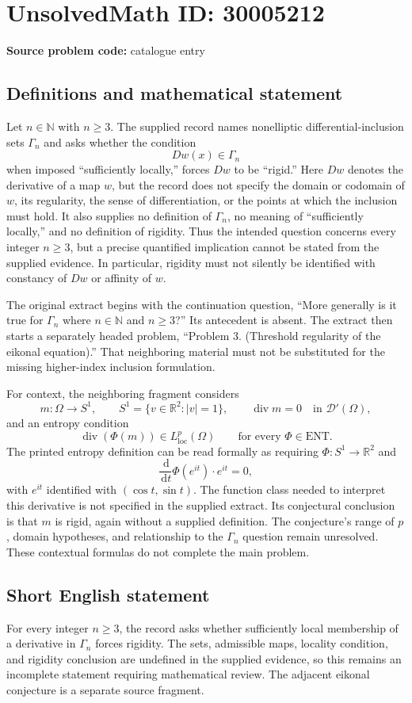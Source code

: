 \documentclass[11pt]{article}
\newcommand{\N}{\mathbb{N}}
\newcommand{\R}{\mathbb{R}}
\newcommand{\dd}{\,\mathrm{d}}
\begin{document}
\section*{UnsolvedMath ID: 30005212}
\textbf{Source problem code:} catalogue entry
\subsection{Definitions and mathematical statement}
Let \(n\in\N\) with \(n\geq 3\). The supplied record names nonelliptic differential-inclusion sets \(\Gamma_n\) and asks whether the condition
\[
Dw(x)\in\Gamma_n
\]
when imposed ``sufficiently locally,'' forces \(Dw\) to be ``rigid.'' Here \(Dw\) denotes the derivative of a map \(w\), but the record does not specify the domain or codomain of \(w\), its regularity, the sense of differentiation, or the points at which the inclusion must hold. It also supplies no definition of \(\Gamma_n\), no meaning of ``sufficiently locally,'' and no definition of rigidity. Thus the intended question concerns every integer \(n\geq3\), but a precise quantified implication cannot be stated from the supplied evidence. In particular, rigidity must not silently be identified with constancy of \(Dw\) or affinity of \(w\).

The original extract begins with the continuation question, ``More generally is it true for \(\Gamma_n\) where \(n\in\N\) and \(n\geq3\)?'' Its antecedent is absent. The extract then starts a separately headed problem, ``Problem 3. (Threshold regularity of the eikonal equation).'' That neighboring material must not be substituted for the missing higher-index inclusion formulation.

For context, the neighboring fragment considers
\[
m:\Omega\longrightarrow S^1,
\qquad S^1=\{v\in\R^2:|v|=1\},
\qquad \operatorname{div}m=0\quad\text{in }\mathcal D'(\Omega),
\]
and an entropy condition
\[
\operatorname{div}(\Phi(m))\in L^p_{\mathrm{loc}}(\Omega)
\qquad\text{for every }\Phi\in\mathrm{ENT}.
\]
The printed entropy definition can be read formally as requiring \(\Phi:S^1\to\R^2\) and
\[
\frac{\dd}{\dd t}\Phi(e^{it})\cdot e^{it}=0,
\]
with \(e^{it}\) identified with \((\cos t,\sin t)\). The function class needed to interpret this derivative is not specified in the supplied extract. Its conjectural conclusion is that \(m\) is rigid, again without a supplied definition. The conjecture's range of \(p\), domain hypotheses, and relationship to the \(\Gamma_n\) question remain unresolved. These contextual formulas do not complete the main problem.
\subsection{Short English statement}
For every integer \(n\geq3\), the record asks whether sufficiently local membership of a derivative in \(\Gamma_n\) forces rigidity. The sets, admissible maps, locality condition, and rigidity conclusion are undefined in the supplied evidence, so this remains an incomplete statement requiring mathematical review. The adjacent eikonal conjecture is a separate source fragment.
\end{document}
